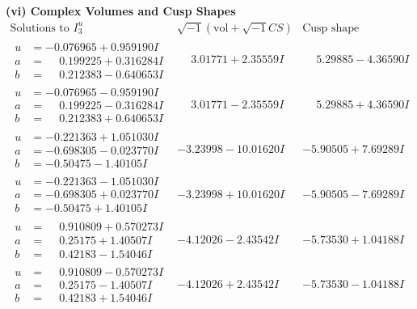 \documentclass[1p]{elsarticle_modified}
\theoremstyle{definition}
\newcommand{\I}{\sqrt{-1}}
\begin{document}
\newpage\flushleft \textbf{(vi) Complex Volumes and Cusp Shapes}
$$\begin{array}{c|c|c}  
\text{Solutions to }I^u_{3}& \I (\text{vol} + \sqrt{-1}CS) & \text{Cusp shape}\\
 \hline 
\begin{aligned}
u &= -0.076965 + 0.959190 I \\
a &= \phantom{-}0.199225 + 0.316284 I \\
b &= \phantom{-}0.212383 - 0.640653 I\end{aligned}
 & \phantom{-}3.01771 + 2.35559 I & \phantom{-}5.29885 - 4.36590 I \\ \hline\begin{aligned}
u &= -0.076965 - 0.959190 I \\
a &= \phantom{-}0.199225 - 0.316284 I \\
b &= \phantom{-}0.212383 + 0.640653 I\end{aligned}
 & \phantom{-}3.01771 - 2.35559 I & \phantom{-}5.29885 + 4.36590 I \\ \hline\begin{aligned}
u &= -0.221363 + 1.051030 I \\
a &= -0.698305 - 0.023770 I \\
b &= -0.50475 - 1.40105 I\end{aligned}
 & -3.23998 - 10.01620 I & -5.90505 + 7.69289 I \\ \hline\begin{aligned}
u &= -0.221363 - 1.051030 I \\
a &= -0.698305 + 0.023770 I \\
b &= -0.50475 + 1.40105 I\end{aligned}
 & -3.23998 + 10.01620 I & -5.90505 - 7.69289 I \\ \hline\begin{aligned}
u &= \phantom{-}0.910809 + 0.570273 I \\
a &= \phantom{-}0.25175 + 1.40507 I \\
b &= \phantom{-}0.42183 - 1.54046 I\end{aligned}
 & -4.12026 - 2.43542 I & -5.73530 + 1.04188 I \\ \hline\begin{aligned}
u &= \phantom{-}0.910809 - 0.570273 I \\
a &= \phantom{-}0.25175 - 1.40507 I \\
b &= \phantom{-}0.42183 + 1.54046 I\end{aligned}
 & -4.12026 + 2.43542 I & -5.73530 - 1.04188 I \\ \hline\begin{aligned}

\end{aligned}
\end{array}$$
\end{document}
